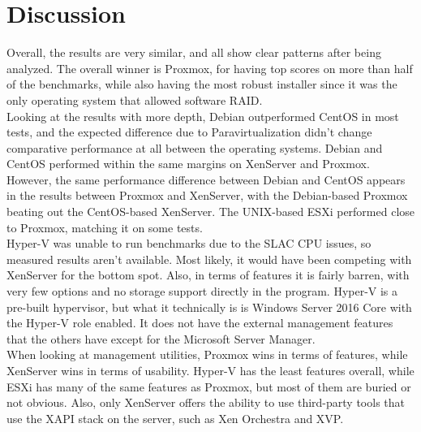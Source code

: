 \documentclass[12pt]{spieman}  %
\begin{document}
\section{Discussion}

Overall, the results are very similar, and all show clear patterns after being analyzed. The overall winner is Proxmox, for having top scores on more than half of the benchmarks, while also having the most robust installer since it was the only operating system that allowed software RAID.\\

Looking at the results with more depth, Debian outperformed CentOS in most tests, and the expected difference due to Paravirtualization didn't change comparative performance at all between the operating systems. Debian and CentOS performed within the same margins on XenServer and Proxmox. However, the same performance difference between Debian and CentOS appears in the results between Proxmox and XenServer, with the Debian-based Proxmox beating out the CentOS-based XenServer. The UNIX-based ESXi performed close to Proxmox, matching it on some tests.\\

Hyper-V was unable to run benchmarks due to the SLAC CPU issues, so measured results aren't available. Most likely, it would have been competing with XenServer for the bottom spot. Also, in terms of features it is fairly barren, with very few options and no storage support directly in the program. Hyper-V is a pre-built hypervisor, but what it technically is is Windows Server 2016 Core with the Hyper-V role enabled. It does not have the external management features that the others have except for the Microsoft Server Manager.\\

When looking at management utilities, Proxmox wins in terms of features, while XenServer wins in terms of usability. Hyper-V has the least features overall, while ESXi has many of the same features as Proxmox, but most of them are buried or not obvious. Also, only XenServer offers the ability to use third-party tools that use the XAPI stack on the server, such as Xen Orchestra and XVP.



\end{document}
